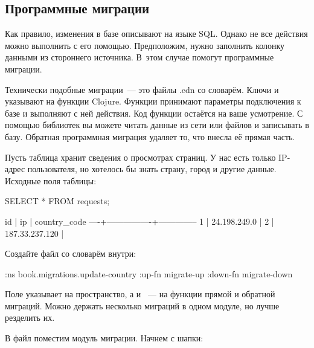\subsection{Программные миграции}

Как правило, изменения в базе описывают на языке SQL. Однако не все действия можно выполнить с его помощью. Предположим, нужно заполнить колонку данными из стороннего источника. В~этом случае помогут программные миграции.

Технически подобные миграции~--- это файлы .edn со словарём. Ключи  и  указывают на функции Clojure. Функции принимают параметры подключения к базе и выполняют с ней действия. Код функции остаётся на ваше усмотрение. С помощью библиотек вы можете читать данные из сети или файлов и записывать в базу. Обратная программная миграция удаляет то, что внесла её прямая часть.

Пусть таблица  хранит сведения о просмотрах страниц. У нас есть только IP-адрес пользователя, но хотелось бы знать страну, город и другие данные. Исходные поля таблицы:

\begin{english}
  \begin{sql}
SELECT * FROM requests;
  \end{sql}
\end{english}

\begin{english}
  \begin{text}
 id |       ip       | country_code
----+----------------+--------------
  1 | 24.198.249.0   |
  2 | 187.33.237.120 |
  \end{text}
\end{english}


Создайте файл  со словарём внутри:

\begin{english}
  \begin{clojure}
{:ns book.migrations.update-country
 :up-fn migrate-up
 :down-fn migrate-down}
  \end{clojure}
\end{english}

Поле  указывает на пространство, а  и ~--- на функции прямой и обратной миграций. Можно держать несколько миграций в одном модуле, но лучше резделить их.

В файл  поместим модуль миграции. Начнем с шапки:

